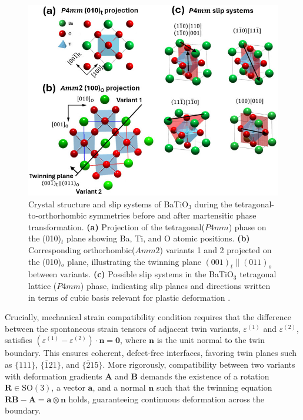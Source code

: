 \documentclass[a4paper,fleqn]{cas-sc}
\begin{document}
\begin{figure}
    \centering
    \includegraphics[width=0.8\linewidth]{figures/BaTiO3_crystal_slip}
    \caption{Crystal structure and slip systems of BaTiO$_3$ during the tetragonal-to-orthorhombic symmetries before and after martensitic phase transformation.  \textbf{(a)} Projection of the tetragonal($P4mm$) phase on the (010)$_t$ plane showing Ba, Ti, and O atomic positions. 
    \textbf{(b)} Corresponding orthorhombic($Amm2$) variants 1 and 2 projected on the (010)$_o$ plane, illustrating the twinning plane $(001)_{t} \parallel (011)_{o}$ between variants. 
    \textbf{(c)} Possible slip systems in the BaTiO$_3$ tetragonal lattice ($P4mm$) phase, indicating slip planes and directions written in terms of cubic basis relevant for plastic deformation \cite{zhu2024twinning,huang2018ferroelectric}.}
   \label{fig:BaTiO3_crystal_slip}
\end{figure}
\par Crucially, mechanical strain compatibility condition requires that the difference between the spontaneous strain tensors of adjacent twin variants, $\varepsilon^{(1)}$ and $\varepsilon^{(2)}$, satisfies $(\varepsilon^{(1)} - \varepsilon^{(2)}) \cdot \mathbf{n} = \mathbf{0}$, where $\mathbf{n}$ is the unit normal to the twin boundary. This ensures coherent, defect-free interfaces, favoring twin planes such as $\{111\}$, $\{\overline{1}21\}$, and $\{\overline{2}15\}$. More rigorously, compatibility between two variants with deformation gradients $\mathbf{A}$ and $\mathbf{B}$ demands the existence of a rotation $\mathbf{R} \in \mathrm{SO}(3)$, a vector $\mathbf{a}$, and a normal $\mathbf{n}$ such that the twinning equation $\mathbf{RB} - \mathbf{A} = \mathbf{a} \otimes \mathbf{n}$ holds, guaranteeing continuous deformation across the boundary. 
\end{document}
